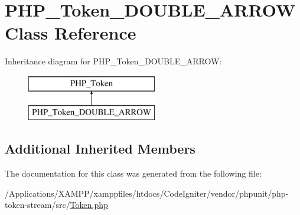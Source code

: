 \hypertarget{class_p_h_p___token___d_o_u_b_l_e___a_r_r_o_w}{}\section{P\+H\+P\+\_\+\+Token\+\_\+\+D\+O\+U\+B\+L\+E\+\_\+\+A\+R\+R\+OW Class Reference}
\label{class_p_h_p___token___d_o_u_b_l_e___a_r_r_o_w}
Inheritance diagram for P\+H\+P\+\_\+\+Token\+\_\+\+D\+O\+U\+B\+L\+E\+\_\+\+A\+R\+R\+OW\+:\begin{figure}[H]
\begin{center}
\leavevmode
\includegraphics[height=2.000000cm]{class_p_h_p___token___d_o_u_b_l_e___a_r_r_o_w}
\end{center}
\end{figure}
\subsection*{Additional Inherited Members}


The documentation for this class was generated from the following file\+:\begin{DoxyCompactItemize}
\item 
/\+Applications/\+X\+A\+M\+P\+P/xamppfiles/htdocs/\+Code\+Igniter/vendor/phpunit/php-\/token-\/stream/src/\mbox{\hyperlink{_token_8php}{Token.\+php}}\end{DoxyCompactItemize}
